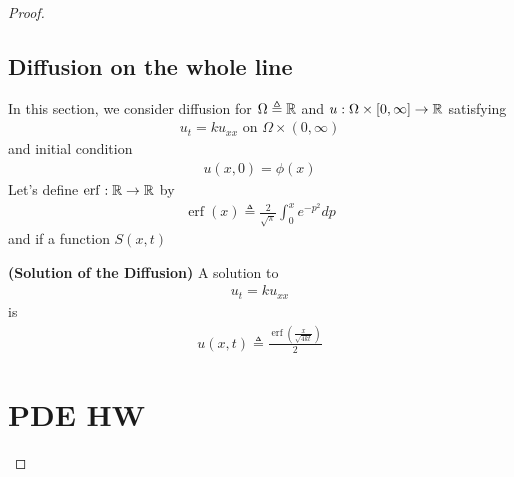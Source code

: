 \documentclass{report}
\begin{document}
\begin{proof}
\section{Diffusion on the whole line}
\begin{mdframed}
In this section, we consider diffusion for $\Omega \triangleq \mathbb{R}$ and $u:\Omega \times [0,\infty]\rightarrow \mathbb{R}$ satisfying  
\begin{align*}
u_t=ku_{xx}\text{ on }\Omega \times (0,\infty)
\end{align*}
and initial condition 
\begin{align*}
u(x,0)=\phi (x)
\end{align*}
Let's define $\operatorname{erf}:\mathbb{R}\rightarrow \mathbb{R}$ by 
\begin{align*}
\operatorname{erf}(x)\triangleq  \frac{2}{\sqrt{\pi}}\int_0^x e^{-p^2}dp
\end{align*}
and if a function $S(x,t)$ 
\end{mdframed}
\begin{theorem}
\textbf{(Solution of the Diffusion)} A solution to 
\begin{align*}
u_t=ku_{xx}
\end{align*}
is 
\begin{align*}
u(x,t)\triangleq \frac{\operatorname{erf}(\frac{x}{\sqrt{4kt}})}{2}
\end{align*}
\end{theorem}
\chapter{PDE HW}

\end{proof}
\end{document}
